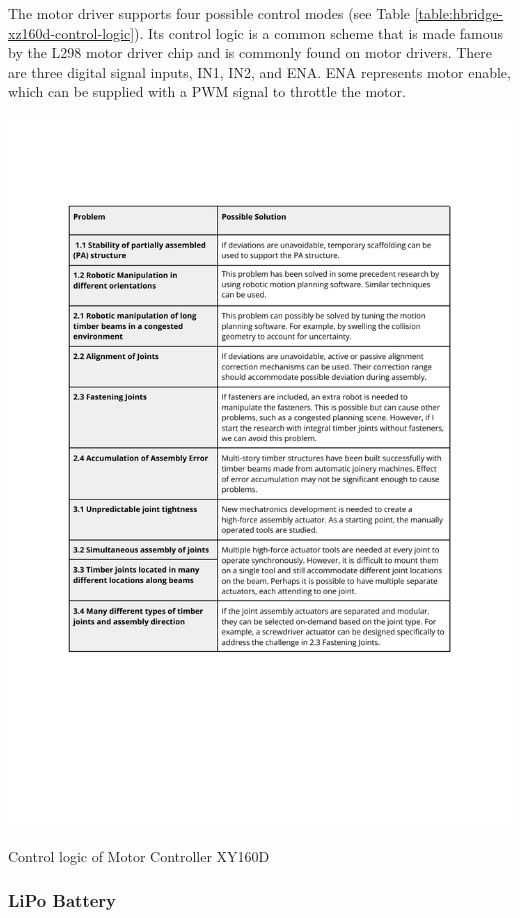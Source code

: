 The motor driver supports four possible control modes (see Table \ref{table:hbridge-xz160d-control-logic}). Its control logic is a common scheme that is made famous by the L298 motor driver chip and is commonly found on motor drivers. There are three digital signal inputs, IN1, IN2, and ENA. ENA represents motor enable, which can be supplied with a PWM signal to throttle the motor.

\begin{table}[]
    \includegraphics[page=5, trim=25.4mm 210mm 25.4mm 33mm, clip, width=\textwidth]{tables/Tables in Chapter 4.pdf}
    \caption{Control logic of Motor Controller XY160D}
    \label{table:hbridge-xz160d-control-logic}
\end{table}

\subsubsection{LiPo Battery}
\label{subsubsection:exploration-1-lipo-battery}

